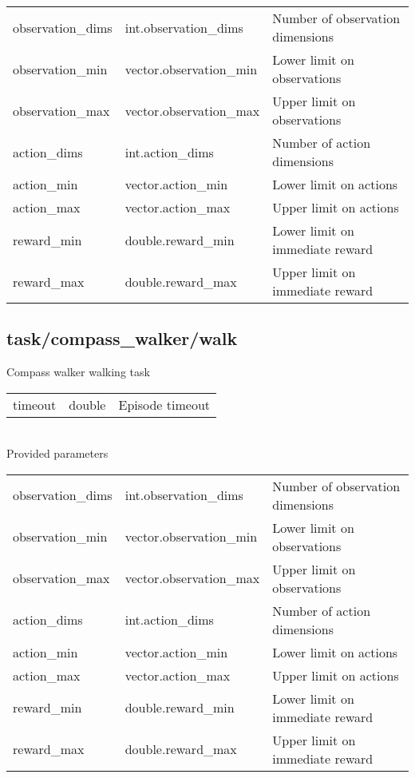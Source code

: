 \noindent\begin{tabular}{@{}lll@{}}
observation\_dims&int.observation\_dims&Number of observation dimensions\\
observation\_min&vector.observation\_min&Lower limit on observations\\
observation\_max&vector.observation\_max&Upper limit on observations\\
action\_dims&int.action\_dims&Number of action dimensions\\
action\_min&vector.action\_min&Lower limit on actions\\
action\_max&vector.action\_max&Upper limit on actions\\
reward\_min&double.reward\_min&Lower limit on immediate reward\\
reward\_max&double.reward\_max&Upper limit on immediate reward\\
\end{tabular}
\subsection{task/compass\_walker/walk}
\noindent Compass walker walking task\\

\noindent\begin{tabular}{@{}lll@{}}
timeout&double&Episode timeout\\
\end{tabular}
\\

\noindent Provided parameters\\

\noindent\begin{tabular}{@{}lll@{}}
observation\_dims&int.observation\_dims&Number of observation dimensions\\
observation\_min&vector.observation\_min&Lower limit on observations\\
observation\_max&vector.observation\_max&Upper limit on observations\\
action\_dims&int.action\_dims&Number of action dimensions\\
action\_min&vector.action\_min&Lower limit on actions\\
action\_max&vector.action\_max&Upper limit on actions\\
reward\_min&double.reward\_min&Lower limit on immediate reward\\
reward\_max&double.reward\_max&Upper limit on immediate reward\\
\end{tabular}

